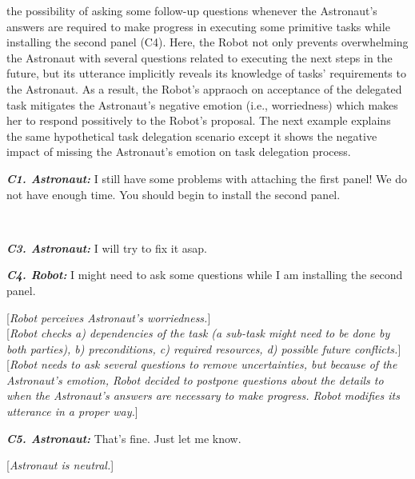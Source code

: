the possibility of asking some follow-up questions whenever the Astronaut's
answers are required to make progress in executing some primitive tasks while
installing the second panel (C4). Here, the Robot not only prevents overwhelming
the Astronaut with several questions related to executing the next steps in the
future, but its utterance implicitly reveals its knowledge of tasks'
requirements to the Astronaut. As a result, the Robot's appraoch on acceptance
of the delegated task mitigates the Astronaut's negative emotion (i.e.,
worriedness) which makes her to respond possitively to the Robot's proposal. The
next example explains the same hypothetical task delegation scenario except it
shows the negative impact of missing the Astronaut's emotion on task delegation
process.\\

\begin{spacing}{1.2}
\small{
\begin{description}
  \item \textit{\textbf{C1. Astronaut:}} I still have some problems with
  attaching the first panel! We do not have enough time. You should begin to
  install the second panel.\\

  \item {}\\
  
  \item \textit{\textbf{C3. Astronaut:}} I will try to fix it asap.\\

  \item \textit{\textbf{C4. Robot:}} I might need to ask some questions while I
  am installing the second panel.

  [\textit{Robot perceives Astronaut's worriedness.}]\\

  [\textit{Robot checks a) dependencies of the task (a sub-task might need to be
  done by both parties), b) preconditions, c) required resources, d) possible
  future conflicts.}]\\
  
  [\textit{Robot needs to ask several questions to remove uncertainties, but
  because of the Astronaut's emotion, Robot decided to postpone questions about
  the details to when the Astronaut's answers are necessary to make progress.
  Robot modifies its utterance in a proper way.}]\\
  
  \item \textit{\textbf{C5. Astronaut:}} That's fine. Just let me know.
  
  [\textit{Astronaut is neutral.}]
  
\end{description}
}
\end{spacing}


